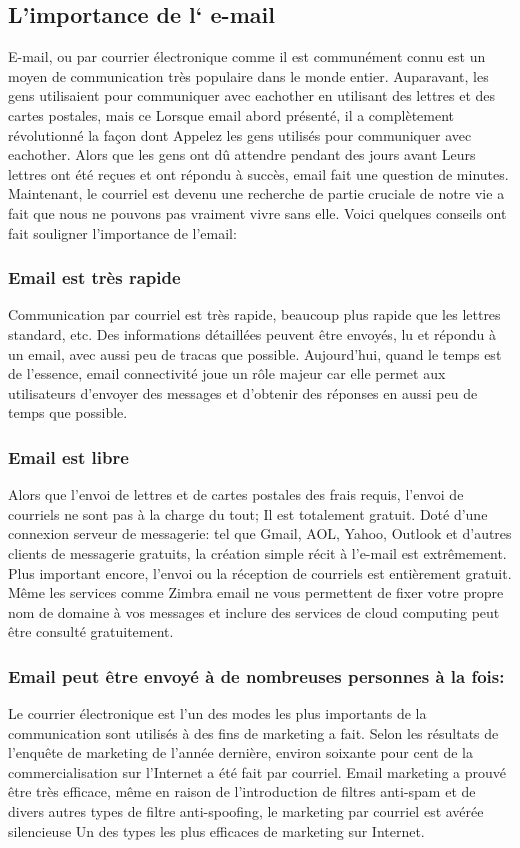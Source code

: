 \documentclass[french]{report}
\begin{document}
\begin{titlepage}
\subsection{\LARGE L’importance de l‘ e-mail}
\LARGE E-mail, ou par courrier électronique comme il est communément connu est un moyen de communication très populaire dans le monde entier. Auparavant, les gens utilisaient pour communiquer avec eachother en utilisant des lettres et des cartes postales, mais ce Lorsque email abord présenté, il a complètement révolutionné la façon dont Appelez les gens utilisés pour communiquer avec eachother. Alors que les gens ont dû attendre pendant des jours avant Leurs lettres ont été reçues et ont répondu à succès, email fait une question de minutes. Maintenant, le courriel est devenu une recherche de partie cruciale de notre vie a fait que nous ne pouvons pas vraiment vivre sans elle. Voici quelques conseils ont fait souligner l’importance de l’email:
\subsubsection{\LARGE Email est très rapide}
\LARGE Communication par courriel est très rapide, beaucoup plus rapide que les lettres standard, etc. Des informations détaillées peuvent être envoyés, lu et répondu à un email, avec aussi peu de tracas que possible. Aujourd’hui, quand le temps est de l’essence, email connectivité joue un rôle majeur car elle permet aux utilisateurs d’envoyer des messages et d’obtenir des réponses en aussi peu de temps que possible.
\subsubsection{\LARGE Email est libre}
\LARGE Alors que l’envoi de lettres et de cartes postales des frais requis, l’envoi de courriels ne sont pas à la charge du tout; Il est totalement gratuit. Doté d’une connexion serveur de messagerie: tel que Gmail, AOL, Yahoo, Outlook et d’autres clients de messagerie gratuits, la création simple récit à l’e-mail est extrêmement. Plus important encore, l’envoi ou la réception de courriels est entièrement gratuit. Même les services comme Zimbra email ne vous permettent de fixer votre propre nom de domaine à vos messages et inclure des services de cloud computing peut être consulté gratuitement.
\subsubsection{\LARGE Email peut être envoyé à de nombreuses personnes à la fois:}
\LARGE Le courrier électronique est l’un des modes les plus importants de la communication sont utilisés à des fins de marketing a fait. Selon les résultats de l’enquête de marketing de l’année dernière, environ soixante pour cent de la commercialisation sur l’Internet a été fait par courriel. Email marketing a prouvé être très efficace, même en raison de l’introduction de filtres anti-spam et de divers autres types de filtre anti-spoofing, le marketing par courriel est avérée silencieuse Un des types les plus efficaces de marketing sur Internet.

\end{titlepage}
\end{document}
